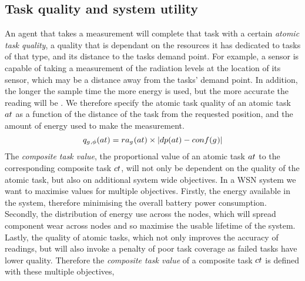 \newcommand{\functionAtomicTaskQualitySignature}[2]{
	\functionSignature{q_{\varAgent{}{}, \varTime{}{}}} {\varAtomicTask{}{}}
}
\newcommand{\functionCompositeTaskValue}[2]{
	\functionSignature{ctv}{\varAtomicTask{}{}}
}

\newcommand{\functionSystemUtility}[2]{\functionSignature{u}{\setTime{}{}}}
\newcommand{\functionCompositeTaskQuality}[2]{
	\functionSignature{taq_\varTime{}{}}{\varCompositeTask{}{}}
}
\newcommand{\functionTaskAbsoluteValue}[2]{
	\functionSignature{atv}{\varCompositeTask{}{}, \varAtomicTask{}{}}
}
\subsection{Task quality and system utility}
An agent that takes a measurement will complete that task with a certain \textit{atomic task quality}, a quality that is dependant on the resources it has dedicated to tasks of that type, and its distance to the tasks demand point. For example, a sensor is capable of taking a measurement of the radiation levels at the location of its sensor, which may be a distance away from the tasks' demand point. In addition, the longer the sample time the more energy is used, but the more accurate the reading will be \cite{dummy}. We therefore specify the atomic task quality of an atomic task $\varAtomicTask{}{}$ as a function of the distance of the task from the requested position, and the amount of energy used to make the measurement.
\begin{equation}
\label{eq:atomic_task_quality}
	\functionAtomicTaskQualitySignature{}{} = \functionTaskResourceAllocation{}{} \times \funcSize{
			\functionTaskDemandPoint{}{} - \functionDeployment{\varAgent{}{}}{}
	}{}
\end{equation}
The \textit{composite task value}, the proportional value of an atomic task $\varAtomicTask{}{}$ to the corresponding composite task $\varCompositeTask{}{}$, will not only be dependent on the quality of the atomic task, but also on additional system wide objectives. In a WSN system we want to maximise values for multiple objectives. Firstly, the energy available in the system, therefore minimising the overall battery power consumption. Secondly, the distribution of energy use across the nodes, which will spread component wear across nodes and so maximise the usable lifetime of the system. Lastly, the quality of atomic tasks, which not only improves the accuracy of readings, but will also invoke a penalty of poor task coverage as failed tasks have lower quality. Therefore the \textit{composite task value} of a composite task $\varCompositeTask{}{}$ is defined with these multiple objectives,
